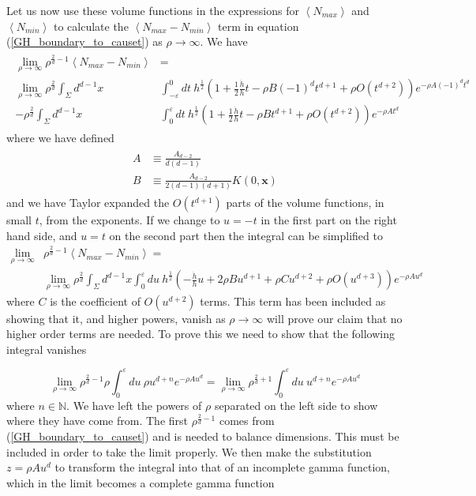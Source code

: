 \documentclass[12pt]{article}
\newcommand{\be}{\begin{equation}}
\newcommand{\ee}{\end{equation}}
\newcommand{\bea}{\begin{aligned}}
\newcommand{\eea}{\end{aligned}}
\begin{document}
Let us now use these volume functions in the expressions for $\left\langle N_{max}\right\rangle$ and $\left\langle N_{min}\right\rangle$ to calculate the $\left\langle N_{max}-N_{min}\right\rangle$ term in equation (\ref{GH_boundary_to_causet}) as $\rho \rightarrow \infty$. We have
\begin{gather}\label{eq:NmaxNminStart}
\begin{aligned}
\lim_{\rho \to \infty}\rho^{\frac{2}{d}-1}\left\langle N_{max}-N_{min} \right\rangle &= \\
\lim_{\rho \to \infty}\rho^{\frac{2}{d}}
\int_{\Sigma}d^{d-1}x & \int_{-\varepsilon}^{0}dt\
h^{\frac{1}{2}}\left(1+
\frac{1}{2}\frac{\dot{h}}{h}t-\rho B(-1)^{d}t^{d+1}+\rho O(t^{d+2})\right)e^{-\rho A(-1)^{d}t^{d}} \\
-\rho^{\frac{2}{d}}\int_{\Sigma}d^{d-1}x &
\int_{0}^{\varepsilon}dt\
h^{\frac{1}{2}}\left(1+
\frac{1}{2}\frac{\dot{h}}{h}t-\rho Bt^{d+1}+\rho O(t^{d+2})\right)e^{-\rho At^{d}}
\end{aligned}
\end{gather}
where we have defined
\begin{gather}\label{A_and_B_defn}
\begin{aligned}
A & \equiv \frac{A_{d-2}}{d(d-1)} \\
B & \equiv \frac{A_{d-2}}{2(d-1)(d+1)}K(0,\mathbf{x})
\end{aligned}
\end{gather}
and we have Taylor expanded the $O(t^{d+1})$ parts of the volume functions, in small $t$, from the exponents. If we change to $u=-t$ in the first part on the right hand side, and $u=t$ on the second part then the integral can be simplified to
\be\bea\label{eq:NmaxNminSimplified}
\lim_{\rho \to \infty}&\rho^{\frac{2}{d}-1}\left\langle N_{max}-N_{min} \right\rangle=\\
&\lim_{\rho \to \infty}\rho^{\frac{2}{d}}
\int_{\Sigma}d^{d-1}x \int_{0}^{\varepsilon}du\
h^{\frac{1}{2}}\left(-\frac{\dot{h}}{h}u+2\rho B u^{d+1}+\rho Cu^{d+2}+\rho O(u^{d+3}) \right)e^{-\rho Au^{d}}
\eea\ee
where $C$ is the coefficient of $O(u^{d+2})$ terms. This term has been included as showing that it, and higher powers, vanish as $\rho \rightarrow\infty$ will prove our claim that no higher order terms are needed. To prove this we need to show that the following integral vanishes

\be\label{eq:VanishingOrderIntegral}
\lim_{\rho \to \infty}\rho^{\frac{2}{d}-1}\rho\int_{0}^{\varepsilon}du\
\rho u^{d+n}e^{-\rho Au^{d}}=\lim_{\rho \to \infty}\rho^{\frac{2}{d}+1}\int_{0}^{\varepsilon}du\
u^{d+n}e^{-\rho Au^{d}}
\ee
where $n\in\mathbb{N}$. We have left the powers of $\rho$ separated on the left side to show where they have come from. The first $\rho^{\frac{2}{d}-1}$ comes from (\ref{GH_boundary_to_causet}) and is needed to balance dimensions. This must be included in order to take the limit properly. We then make the substitution $z=\rho Au^{d}$ to transform the integral into that of an incomplete gamma function, which in the limit becomes a complete gamma function
\end{document}
